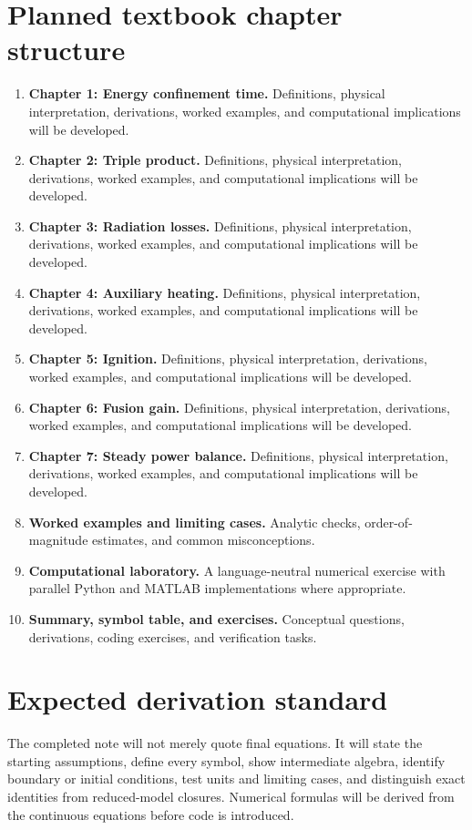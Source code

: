 \documentclass[11pt]{article}
\begin{document}
\section{Planned textbook chapter structure}
\begin{enumerate}[leftmargin=1.8em]
\item \textbf{Chapter 1: Energy confinement time.} Definitions, physical interpretation, derivations, worked examples, and computational implications will be developed.
\item \textbf{Chapter 2: Triple product.} Definitions, physical interpretation, derivations, worked examples, and computational implications will be developed.
\item \textbf{Chapter 3: Radiation losses.} Definitions, physical interpretation, derivations, worked examples, and computational implications will be developed.
\item \textbf{Chapter 4: Auxiliary heating.} Definitions, physical interpretation, derivations, worked examples, and computational implications will be developed.
\item \textbf{Chapter 5: Ignition.} Definitions, physical interpretation, derivations, worked examples, and computational implications will be developed.
\item \textbf{Chapter 6: Fusion gain.} Definitions, physical interpretation, derivations, worked examples, and computational implications will be developed.
\item \textbf{Chapter 7: Steady power balance.} Definitions, physical interpretation, derivations, worked examples, and computational implications will be developed.
\item \textbf{Worked examples and limiting cases.} Analytic checks, order-of-magnitude estimates, and common misconceptions.
\item \textbf{Computational laboratory.} A language-neutral numerical exercise with parallel Python and MATLAB implementations where appropriate.
\item \textbf{Summary, symbol table, and exercises.} Conceptual questions, derivations, coding exercises, and verification tasks.
\end{enumerate}

\section{Expected derivation standard}
The completed note will not merely quote final equations. It will state the starting assumptions, define every symbol, show intermediate algebra, identify boundary or initial conditions, test units and limiting cases, and distinguish exact identities from reduced-model closures. Numerical formulas will be derived from the continuous equations before code is introduced.
\end{document}
